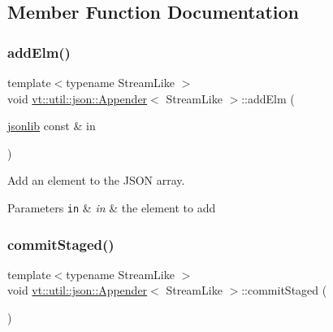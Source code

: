 \subsection{Member Function Documentation}
\mbox{\label{structvt_1_1util_1_1json_1_1_appender_a003145544b1a6a9013d69217528d2f4e}} 
\subsubsection{\texorpdfstring{add\+Elm()}{addElm()}}
{\footnotesize\ttfamily template$<$typename Stream\+Like $>$ \\
void \hyperlink{structvt_1_1util_1_1json_1_1_appender}{vt\+::util\+::json\+::\+Appender}$<$ Stream\+Like $>$\+::add\+Elm (\begin{DoxyParamCaption}\item[{\hyperlink{structvt_1_1util_1_1json_1_1_appender_aa822e25e24db1cdea96f00b79f55f492}{jsonlib} const \&}]{in }\end{DoxyParamCaption})\hspace{0.3cm}{\ttfamily [inline]}}



Add an element to the J\+S\+ON array. 


\begin{DoxyParams}[1]{Parameters}
\mbox{\tt in}  & {\em in} & the element to add \\
\hline
\end{DoxyParams}
\mbox{\label{structvt_1_1util_1_1json_1_1_appender_a1bec71bb4129153f778b4ab5ef9a1fa2}} 
\subsubsection{\texorpdfstring{commit\+Staged()}{commitStaged()}}
{\footnotesize\ttfamily template$<$typename Stream\+Like $>$ \\
void \hyperlink{structvt_1_1util_1_1json_1_1_appender}{vt\+::util\+::json\+::\+Appender}$<$ Stream\+Like $>$\+::commit\+Staged (\begin{DoxyParamCaption}{ }\end{DoxyParamCaption})\hspace{0.3cm}{\ttfamily [inline]}}



